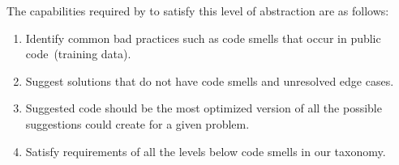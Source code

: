 The capabilities required by \cct{} to satisfy this level of abstraction are as follows:
\begin{enumerate}
    \item Identify common bad practices such as code smells that occur in public code~(training data).
    \item Suggest solutions that do not have code smells and unresolved edge cases.
    \item Suggested code should be the most optimized version of all the possible suggestions \cct{} could create for a given problem.
    \item Satisfy requirements of all the levels below code smells in our taxonomy.
\end{enumerate}

